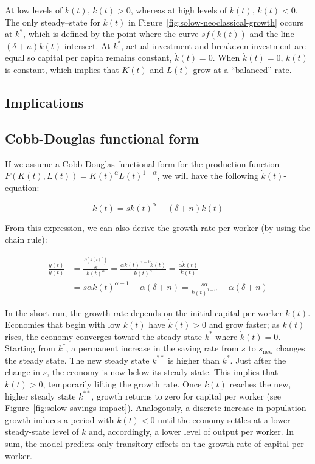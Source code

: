 \documentclass[\topdir/lecture\_notes.tex]{subfiles}
\begin{document}
At low levels of \(k(t)\), \(\dot{k}(t)>0\), whereas at high levels of \(k(t)\), \(\dot{k}(t)<0\).
The only steady--state for \(k(t)\) in Figure~\ref{fig:solow-neoclassical-growth} occurs at \(k^{*}\), which is defined by the point where the curve \(s f(k(t))\) and the line \((\delta+n) k(t)\) intersect.
At \(k^{*}\), actual investment and breakeven investment are equal so capital per capita remains constant, \(\dot{k}(t)=0\).
When \(\dot{k}(t)=0\), \(k(t)\) is constant, which implies that \(K(t)\) and \(L(t)\) grow at a ``balanced'' rate.

\subsection{Implications}
\subsection{Cobb-Douglas functional form}
If we assume a Cobb-Douglas functional form for the production function \(F(K(t), L(t)) = K(t)^{\alpha} L(t)^{1-\alpha}\), we will have the following \(\dot{k}(t)\)-equation:

\begin{equation}
  \dot{k}(t)=s k(t)^{\alpha}-(\delta+n) k(t) \label{eq:solow-k-dot-cobb-douglas}
\end{equation}

From this expression, we can also derive the growth rate per worker (by using the chain rule):

\begin{equation}
\begin{aligned}
\frac{\dot{y}(t)}{y(t)} & =\frac{\frac{\partial\left(k(t)^{\alpha}\right)}{\partial t}}{k(t)^{\alpha}}=\frac{\alpha k(t)^{\alpha-1} \dot{k}(t)}{k(t)^{\alpha}}=\frac{\alpha \dot{k}(t)}{k(t)} \\
& =s \alpha k(t)^{\alpha-1}-\alpha(\delta+n)=\frac{s \alpha}{k(t)^{1-\alpha}}-\alpha(\delta+n)
\end{aligned}
\label{eq:solow-growth-rate-per-worker}
\end{equation}

In the short run, the growth rate depends on the initial capital per worker \(k(t)\).
Economies that begin with low \(k(t)\) have \(\dot{k}(t)>0\) and grow faster; as \(k(t)\) rises, the economy converges toward the steady state \(k^{*}\) where \(\dot{k}(t)=0\).
Starting from \(k^{*}\), a permanent increase in the saving rate from \(s\) to \(s_{\text{new}}\) changes the steady state.
The new steady state \(k^{**}\) is higher than \(k^{*}\).
Just after the change in \(s\), the economy is now below its steady-state.
This implies that \(\dot{k}(t)>0\), temporarily lifting the growth rate.
Once \(k(t)\) reaches the new, higher steady state \(k^{**}\), growth returns to zero for capital per worker (see Figure~\ref{fig:solow-savings-impact}).
Analogously, a discrete increase in population growth induces a period with \(\dot{k}(t)<0\) until the economy settles at a lower steady-state level of \(k\) and, accordingly, a lower level of output per worker.
In sum, the model predicts only transitory effects on the growth rate of capital per worker.
\end{document}
